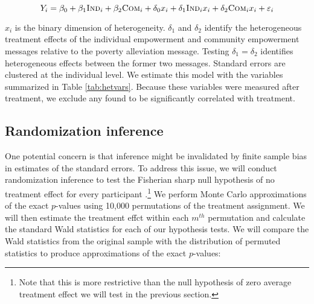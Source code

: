 \documentclass[11pt, a4paper]{article}\usepackage[]{graphicx}\usepackage[]{color}
\begin{document}
        \begin{equation}
            Y_{i} = \beta_{0} + \beta_{1}\text{\textsc{Ind}}_{i} + \beta_{2}\text{\textsc{Com}}_{i} + \delta_{0} x_i + \delta_{1}\text{\textsc{Ind}}_{i} x_i + \delta_{2}\text{\textsc{Com}}_{i} x_i + \varepsilon_{i}
        \label{eq:heteffect} \end{equation}

        $x_{i}$ is the binary dimension of heterogeneity. $\delta_{1}$ and $\delta_{2}$ identify the heterogeneous treatment effects of the individual empowerment and community empowerment messages relative to the poverty alleviation message. Testing $\delta_{1} = \delta_{2}$ identifies heterogeneous effects between the former two messages. Standard errors are clustered at the individual level. We estimate this model with the  variables summarized in Table \ref{tab:hetvars}. Because these variables were measured after treatment, we exclude any found to be significantly correlated with treatment.

        \begin{table}[h]
        \centering
        \caption{Dimensions of heterogeneity}
        \label{tab:hetvars}
        \end{table}

    \subsection{Randomization inference}

        One potential concern is that inference might be invalidated by finite sample bias in estimates of the standard errors. To address this issue, we will conduct randomization inference to test the Fisherian sharp null hypothesis of no treatment effect for every participant \parencite{fisher_design_1935}.\footnote{Note that this is more restrictive than the null hypothesis of zero average treatment effect we will test in the previous section.} We perform Monte Carlo approximations of the exact $p$-values using 10,000 permutations of the treatment assignment. We will then estimate the treatment effct within each $m^{th}$ permutation and calculate the standard Wald statistics for each of our hypothesis tests. We will compare the Wald statistics from the original sample with the distribution of permuted statistics to produce approximations of the exact $p$-values:
\end{document}
